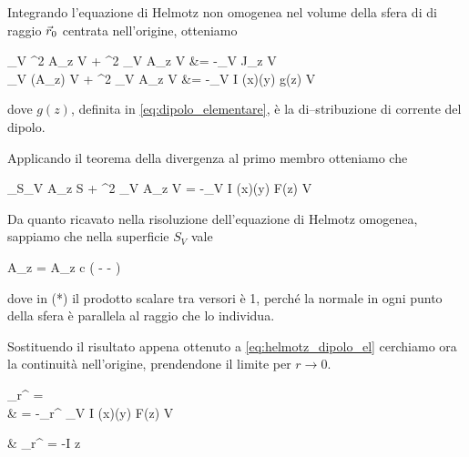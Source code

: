 Integrando l'equazione di Helmotz non omogenea nel volume della sfera di di raggio $\vec{r}_0$ centrata nell'origine, otteniamo
\begin{esp*}
	\int_V \nabla^2 A_z \de V + \omega^2 \mu \epsilon \int_V A_z \de V &= -\mu \int_V J_z \de V \\
	\int_V \diverg(\nabla A_z) \de V + \omega^2 \mu \epsilon \int_V A_z \de V &= -\mu \int_V I \delta(x)\delta(y) g(z) \de V
\end{esp*}
dove $g(z)$, definita in \autoref{eq:dipolo_elementare}, è la di--stribuzione di corrente del dipolo.

Applicando il teorema della divergenza al primo membro otteniamo che
\begin{esp} \label{eq:helmotz_dipolo_el}
	\int_{S_V} \nabla A_z  \de S
	+ \omega^2 \mu \epsilon \int_V A_z \de V
	= -\mu \int_V I \delta(x)\delta(y) F(z) \de V \\
\end{esp}

Da quanto ricavato nella risoluzione dell'equazione di Helmotz omogenea, sappiamo che nella superficie $S_V$ vale
\begin{esp*}
	\nabla A_z \cdot {}
	=  A_z  \cdot {}
	\stackrel{(*)}{=} c \left(
			-\jmath \beta {}
			- 
		\right)
\end{esp*}
dove in (*) il prodotto scalare tra versori è 1, perché la normale in ogni punto della sfera è parallela al raggio che lo individua.

Sostituendo il risultato appena ottenuto a \autoref{eq:helmotz_dipolo_el} cerchiamo ora la continuità nell'origine, prendendone il limite per $r \to 0$.

\begin{esp*}
	\lim_{r^\prime {}}  = \\
	& = -\mu \lim_{r^\prime {}} \int_V I \delta(x)\delta(y) F(z) \de V \\
\end{esp*}

\begin{esp*}
	& \lim_{r^\prime {}} 
	= -\mu I \Delta z \\
\end{esp*}

